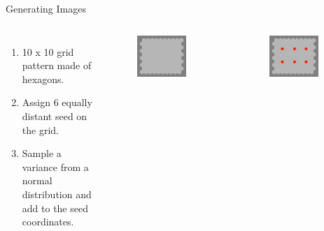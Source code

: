 \documentclass[10pt,xcolor=svgnames]{beamer} %
\begin{document}
\begin{frame}{Generating Images}
\begin{columns}
    \vspace{-1cm}
    \begin{enumerate}
        \item 10 x 10 grid pattern made of hexagons.
        \vspace{1.5cm}
        \item Assign 6 equally distant seed on the grid. 
        \vspace{1.5cm}
        \item Sample a variance from a normal distribution and add to the seed coordinates.
    \end{enumerate}
    \vspace{-0.25cm}
    \begin{figure}
        \centering
        \includegraphics[width=0.8\textwidth]{pictures/img3_cut0.png}
    \end{figure}
    \vspace{-0.7cm}
    \begin{figure}
        \centering
        \includegraphics[width=0.8\textwidth]{pictures/img3_cut0_seeds.png}

\end{figure}
\end{columns}
\end{frame}
\end{document}
